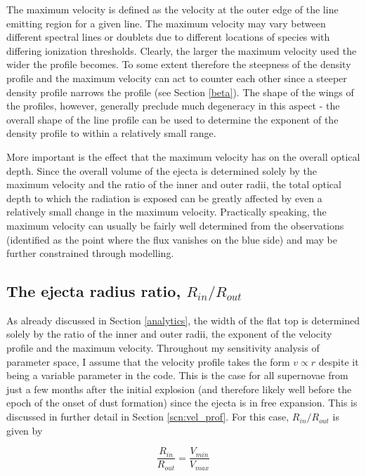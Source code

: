 The maximum velocity is defined as the velocity at the outer edge of 
the line emitting region for a given line.  The 
maximum velocity may vary between different spectral lines or doublets due 
to different locations of  species with differing ionization 
thresholds.  Clearly, the larger the maximum velocity used the wider the 
profile becomes.  To some extent therefore the steepness of the density 
profile and the maximum velocity can act to counter each other since a steeper 
density profile narrows the profile (see Section \ref{beta}).  The shape 
of the wings of the profiles, however, generally preclude much degeneracy 
in this aspect - the overall shape of the line profile can be used to determine the 
exponent of the density profile to within a relatively small range.

More important is the effect that the maximum velocity has on the overall 
optical depth.  Since the overall volume of the ejecta is determined 
solely by the maximum velocity and the ratio of the inner and outer radii, 
the total optical depth to which the radiation is exposed can be greatly 
affected by even a relatively small change in the maximum velocity.  
Practically speaking, the maximum velocity can usually be fairly well determined 
from the observations (identified as the point where the flux vanishes 
on the blue side) and may be further constrained through modelling.

\subsection{The ejecta radius ratio, $R_{in}/R_{out}$}

As already discussed in Section \ref{analytics}, the width of the flat top 
is determined solely by the ratio of the inner and outer radii, the 
exponent of the velocity profile and the maximum velocity.  Throughout my sensitivity analysis of parameter space, I  
assume that the velocity profile takes the form $v \propto r$ despite it being a variable parameter in the code.  This is the case for all supernovae from just a few months after the initial explosion (and therefore likely well before the epoch of the onset of dust formation) since the ejecta is in free expansion.  This is discussed in further detail in Section \ref{scn:vel_prof}.  For this case, $R_{in}/R_{out}$ is given by

\begin{equation}
\frac{R_{in}}{R_{out}}=\frac{V_{min}}{V_{max}}
\end{equation}

